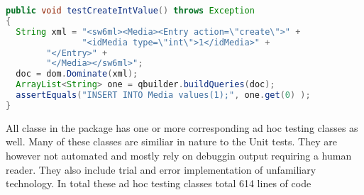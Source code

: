 \begin{Code}
\begin{lstlisting}[label=code:testCase,language=java,caption=A JUnit test case]
public void testCreateIntValue() throws Exception
{
  String xml = "<sw6ml><Media><Entry action=\"create\">" +
               "<idMedia type=\"int\">1</idMedia>" +
		"</Entry>" +
		"</Media></sw6ml>";
  doc = dom.Dominate(xml);
  ArrayList<String> one = qbuilder.buildQueries(doc);
  assertEquals("INSERT INTO Media values(1);", one.get(0) );	
}
\end{lstlisting}
\end{Code}

All classe in the  package has one or more corresponding ad hoc testing classes as well. Many of these classes are similiar in nature to the Unit tests.
They are however not automated and mostly rely on  debuggin output requiring a human reader. 
They also include trial and error implementation of unfamiliary technology.
In total these ad hoc testing classes total 614 lines of code


